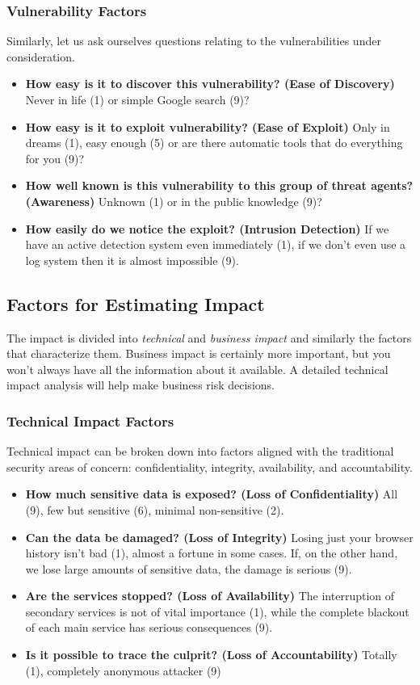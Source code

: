 \subsubsection{Vulnerability Factors}
Similarly, let us ask ourselves questions relating to the vulnerabilities under consideration.
\begin{itemize}
    \itemsep0em
    \item \textbf{How easy is it to discover this vulnerability? (Ease of Discovery)} Never in life (1) or simple Google search (9)?
    \item \textbf{How easy is it to exploit vulnerability? (Ease of Exploit)} Only in dreams (1), easy enough (5) or are there automatic tools that do everything for you (9)?
    \item \textbf{How well known is this vulnerability to this group of threat agents? (Awareness)} Unknown (1) or in the public knowledge (9)?
    \item \textbf{How easily do we notice the exploit? (Intrusion Detection)} If we have an active detection system even immediately (1), if we don't even use a log system then it is almost impossible (9).
\end{itemize}
\subsection{Factors for Estimating Impact}
The impact is divided into \textit{technical} and \textit{business impact} and similarly the factors that characterize them. Business impact is certainly more important, but you won't always have all the information about it available. A detailed technical impact analysis will help make business risk decisions.
\subsubsection{Technical Impact Factors}
Technical impact can be broken down into factors aligned with the traditional security areas of concern: confidentiality, integrity, availability, and accountability.
\begin{itemize}
    \itemsep0em
    \item \textbf{How much sensitive data is exposed? (Loss of Confidentiality)} All (9), few but sensitive (6), minimal non-sensitive (2).
    \item \textbf{Can the data be damaged? (Loss of Integrity)} Losing just your browser history isn't bad (1), almost a fortune in some cases. If, on the other hand, we lose large amounts of sensitive data, the damage is serious (9).
    \item \textbf{Are the services stopped? (Loss of Availability)} The interruption of secondary services is not of vital importance (1), while the complete blackout of each main service has serious consequences (9).
    \item \textbf{Is it possible to trace the culprit? (Loss of Accountability)} Totally (1), completely anonymous attacker (9)
\end{itemize}
